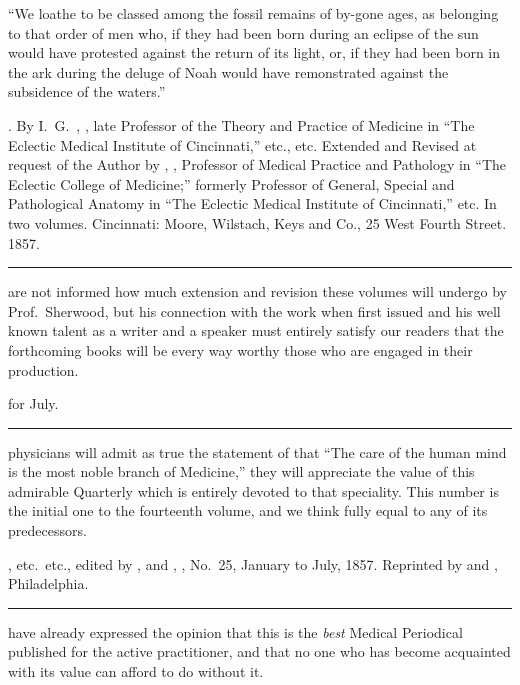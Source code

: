 
``We loathe to be classed among the fossil remains of by-gone ages,
as belonging to that order of men who, if they had been born during
an eclipse of the sun would have protested against the return of its
light, or, if they had been born in the ark during the deluge of Noah
would have remonstrated against the subsidence of the waters.''

\smallornament
\footnotesize
{}. By I.~G.\ , \md, late Professor of the
Theory and Practice of Medicine in ``The Eclectic Medical Institute of Cincinnati,''
etc., etc. Extended and Revised at request of the Author by , \md,
Professor of Medical Practice and Pathology in ``The Eclectic College of Medicine;''
formerly Professor of General, Special and Pathological Anatomy in ``The Eclectic
Medical Institute of Cincinnati,'' etc. In two volumes. Cincinnati: Moore, Wilstach,
Keys and Co., 25 West Fourth Street. 1857.
\plainbreak{1}
\normalsize

 are not informed how much extension and revision these volumes
will undergo by Prof.\ Sherwood, but his connection with the work when
first issued and his well known talent as a writer and a speaker must
entirely satisfy our readers that the forthcoming books will be every
way worthy those who are engaged in their production.

\smallornament
\footnotesize
{} for July.
\plainbreak{1}
\normalsize

 physicians will admit as true the statement of  that ``The
care of the human mind is the most noble branch of Medicine,'' they
will appreciate the value of this admirable Quarterly which is entirely
devoted to that speciality. This number is the initial one to the fourteenth
volume, and we think fully equal to any of its predecessors.

\smallornament
\footnotesize
{}, etc.\ etc., edited by , \md
and , \md, No.\ 25, January to July, 1857. Reprinted by  and
, Philadelphia.
\plainbreak{1}
\normalsize

 have already expressed the opinion that this is the \emph{best} Medical
Periodical published for the active practitioner, and that no one who
has become acquainted with its value can afford to do without it.

